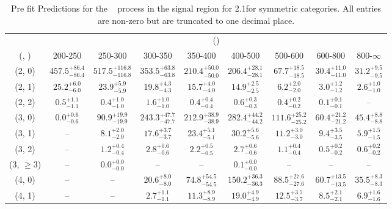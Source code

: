 \begin{table}[h!]
\tiny
\centering
\caption{Pre fit Predictions for the \zInv~ process in the signal region for 2.1\ifb for symmetric categories. All entries are non-zero but are truncated to one decimal place.\label{tab:predsep_sig_zinv_sym}}
\begin{tabular}
{ccccccccc}
	\hline\hline
	& \multicolumn{8}{c}{\scalht (\gev)} \\ 
	 (\njet,  \nb) & 200-250 & 250-300 & 300-350 & 350-400 & 400-500 & 500-600 & 600-800 & 800-$\infty$ \\ [0.8ex] 
\hline
	(2, 0) & $457.5^{+ 86.4 }_{- 86.4 }$ & $517.5^{+ 116.8 }_{- 116.8 }$ & $353.5^{+ 63.8 }_{- 63.8 }$ & $210.4^{+ 50.0 }_{- 50.0 }$ & $206.4^{+ 28.1 }_{- 28.1 }$ & $67.7^{+ 18.5 }_{- 18.5 }$ & $30.4^{+ 11.0 }_{- 11.0 }$ & $31.2^{+ 9.5 }_{- 9.5 }$ \\[0.5ex] 
	(2, 1) & $25.2^{+ 6.0 }_{- 6.0 }$ & $23.9^{+ 5.9 }_{- 5.9 }$ & $19.8^{+ 4.3 }_{- 4.3 }$ & $15.7^{+ 4.0 }_{- 4.0 }$ & $14.9^{+ 2.5 }_{- 2.5 }$ & $6.2^{+ 2.0 }_{- 2.0 }$ & $3.0^{+ 1.2 }_{- 1.2 }$ & $2.6^{+ 1.0 }_{- 1.0 }$ \\[0.5ex] 
	(2, 2) & $0.5^{+ 1.1 }_{- 1.1 }$ & $0.4^{+ 1.0 }_{- 1.0 }$ & $1.6^{+ 1.0 }_{- 1.0 }$ & $0.4^{+ 0.4 }_{- 0.4 }$ & $0.6^{+ 0.3 }_{- 0.3 }$ & $0.4^{+ 0.2 }_{- 0.2 }$ & $0.1^{+ 0.1 }_{- 0.1 }$ & -- \\[0.5ex] 
	(3, 0) & $0.0^{+ 0.6 }_{- 0.6 }$ & $90.9^{+ 19.9 }_{- 19.9 }$ & $243.3^{+ 47.7 }_{- 47.7 }$ & $212.9^{+ 38.9 }_{- 38.9 }$ & $282.4^{+ 44.2 }_{- 44.2 }$ & $111.6^{+ 25.2 }_{- 25.2 }$ & $60.4^{+ 21.2 }_{- 21.2 }$ & $45.4^{+ 8.8 }_{- 8.8 }$ \\[0.5ex] 
	(3, 1) & -- & $8.1^{+ 2.0 }_{- 2.0 }$ & $17.6^{+ 3.7 }_{- 3.7 }$ & $23.4^{+ 5.1 }_{- 5.1 }$ & $30.2^{+ 5.6 }_{- 5.6 }$ & $11.2^{+ 3.0 }_{- 3.0 }$ & $9.4^{+ 3.5 }_{- 3.5 }$ & $5.9^{+ 1.5 }_{- 1.5 }$ \\[0.5ex] 
	(3, 2) & -- & $1.2^{+ 0.4 }_{- 0.4 }$ & $2.8^{+ 0.6 }_{- 0.6 }$ & $2.2^{+ 0.5 }_{- 0.5 }$ & $2.7^{+ 0.6 }_{- 0.6 }$ & $1.1^{+ 0.4 }_{- 0.4 }$ & $0.5^{+ 0.2 }_{- 0.2 }$ & $0.6^{+ 0.2 }_{- 0.2 }$ \\[0.5ex] 
	(3, $\ge3$) & -- & $0.0^{+ 0.0 }_{- 0.0 }$ & -- & -- & $0.1^{+ 0.0 }_{- 0.0 }$ & -- & -- & -- \\[0.5ex] 
	(4, 0) & -- & -- & $20.6^{+ 8.0 }_{- 8.0 }$ & $74.8^{+ 54.5 }_{- 54.5 }$ & $150.2^{+ 36.3 }_{- 36.3 }$ & $88.5^{+ 27.6 }_{- 27.6 }$ & $60.7^{+ 13.5 }_{- 13.5 }$ & $35.5^{+ 8.3 }_{- 8.3 }$ \\[0.5ex] 
	(4, 1) & -- & -- & $2.7^{+ 1.1 }_{- 1.1 }$ & $11.3^{+ 8.9 }_{- 8.9 }$ & $19.0^{+ 4.9 }_{- 4.9 }$ & $12.5^{+ 3.7 }_{- 3.7 }$ & $8.5^{+ 2.1 }_{- 2.1 }$ & $6.9^{+ 1.6 }_{- 1.6 }$ \\[0.5ex] 

\end{tabular}
\end{table}
